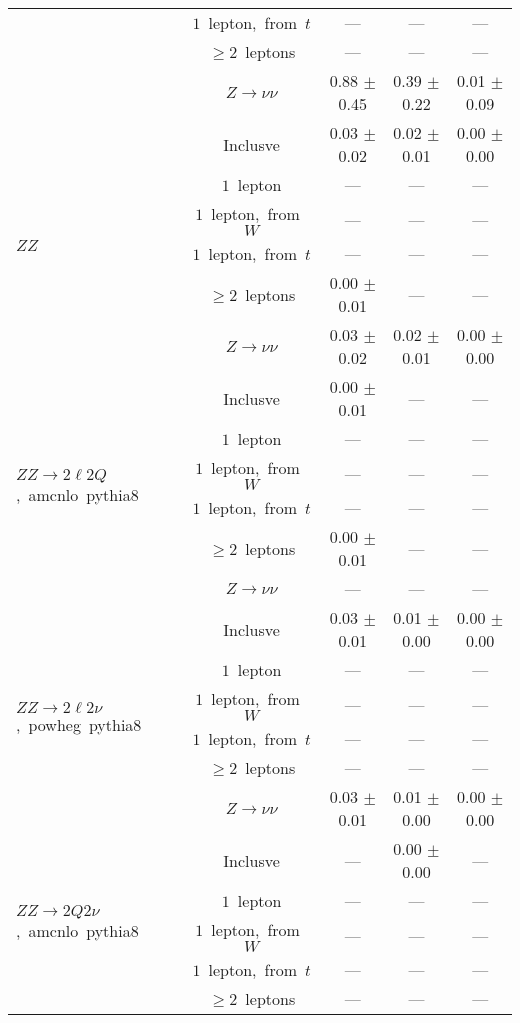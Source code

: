 \documentclass{article}
\begin{document}
\begin{longtable}{|l|c|c|c|c|}
 & $1$~lepton,~from~$t$  & ---  & ---  & --- \\* 
 & $\ge2$~leptons  & ---  & ---  & --- \\* 
 & $Z\rightarrow\nu\nu$  & 0.88 $\pm$ 0.45  & 0.39 $\pm$ 0.22  & 0.01 $\pm$ 0.09 \\* 
\hline 
\multirow{6}{*}{$ZZ$} & Inclusve  & 0.03 $\pm$ 0.02  & 0.02 $\pm$ 0.01  & 0.00 $\pm$ 0.00 \\* 
 & $1$~lepton  & ---  & ---  & --- \\* 
 & $1$~lepton,~from~$W$  & ---  & ---  & --- \\* 
 & $1$~lepton,~from~$t$  & ---  & ---  & --- \\* 
 & $\ge2$~leptons  & 0.00 $\pm$ 0.01  & ---  & --- \\* 
 & $Z\rightarrow\nu\nu$  & 0.03 $\pm$ 0.02  & 0.02 $\pm$ 0.01  & 0.00 $\pm$ 0.00 \\* 
\hline 
\multirow{6}{*}{$ZZ{\rightarrow}2{\ell}2Q$,~amcnlo~pythia8} & Inclusve  & 0.00 $\pm$ 0.01  & ---  & --- \\* 
 & $1$~lepton  & ---  & ---  & --- \\* 
 & $1$~lepton,~from~$W$  & ---  & ---  & --- \\* 
 & $1$~lepton,~from~$t$  & ---  & ---  & --- \\* 
 & $\ge2$~leptons  & 0.00 $\pm$ 0.01  & ---  & --- \\* 
 & $Z\rightarrow\nu\nu$  & ---  & ---  & --- \\* 
\hline 
\multirow{6}{*}{$ZZ{\rightarrow}2{\ell}2{\nu}$,~powheg~pythia8} & Inclusve  & 0.03 $\pm$ 0.01  & 0.01 $\pm$ 0.00  & 0.00 $\pm$ 0.00 \\* 
 & $1$~lepton  & ---  & ---  & --- \\* 
 & $1$~lepton,~from~$W$  & ---  & ---  & --- \\* 
 & $1$~lepton,~from~$t$  & ---  & ---  & --- \\* 
 & $\ge2$~leptons  & ---  & ---  & --- \\* 
 & $Z\rightarrow\nu\nu$  & 0.03 $\pm$ 0.01  & 0.01 $\pm$ 0.00  & 0.00 $\pm$ 0.00 \\* 
\hline 
\multirow{6}{*}{$ZZ{\rightarrow}2Q2{\nu}$,~amcnlo~pythia8} & Inclusve  & ---  & 0.00 $\pm$ 0.00  & --- \\* 
 & $1$~lepton  & ---  & ---  & --- \\* 
 & $1$~lepton,~from~$W$  & ---  & ---  & --- \\* 
 & $1$~lepton,~from~$t$  & ---  & ---  & --- \\* 
 & $\ge2$~leptons  & ---  & ---  & --- \\* 

\end{longtable}
\end{document}

